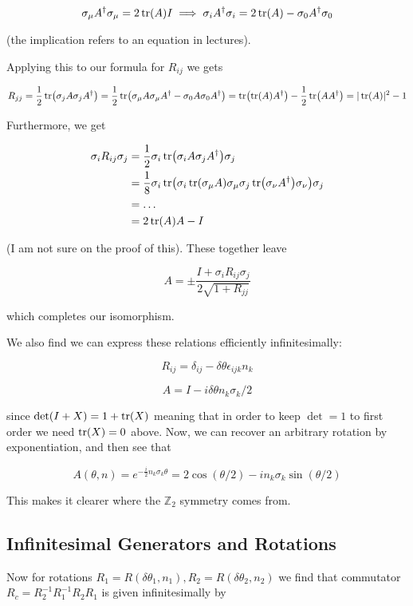 \documentclass{article}
\theoremstyle{definition}
\begin{document}
$$ \sigma_\mu A^\dagger \sigma_\mu = 2 \tr(A) I \implies \sigma_i A^\dagger
\sigma_i = 2 \tr(A) - \sigma_0 A^\dagger \sigma_0 $$

(the implication refers to an equation in lectures).

Applying this to our formula for $R_{ij}$ we gets

$$ R_{jj} = \frac{1}{2} \tr(\sigma_j A \sigma_j A^\dagger) = \frac{1}{2}
\tr(\sigma_\mu A \sigma_\mu A^\dagger - \sigma_0 A \sigma_0 A^\dagger) =
\tr(\tr(A) A^\dagger) - \frac{1}{2} \tr(AA^\dagger) = |\tr(A)|^2 - 1 $$

Furthermore, we get

\begin{align*}
\sigma_i R_{ij} \sigma_j
&= \frac{1}{2} \sigma_i \tr(\sigma_i A \sigma_j A^\dagger) \sigma_j \\
&= \frac{1}{8} \sigma_i \tr(\sigma_i \tr(\sigma_\mu A) \sigma_\mu \sigma_j \tr(\sigma_\nu A^\dagger) \sigma_\nu) \sigma_j \\
&= \dots \\
&= 2\tr(A)A - I
\end{align*}

(I am not sure on the proof of this). These together leave

$$ A = \pm \frac{I + \sigma_i R_{ij} \sigma_j}{2\sqrt{1 + R_{jj}}} $$

which completes our isomorphism.

We also find we can express these relations efficiently infinitesimally:

$$ R_{ij} = \delta_{ij} - \delta \theta \epsilon_{ijk} n_k $$

$$ A = I - i \delta \theta n_k \sigma_k / 2 $$

since $\det(I + X) = 1 + \tr(X)$ meaning that in order to keep $\det = 1$ to
first order we need $\tr(X) = 0$ above. Now, we can recover an arbitrary
rotation by exponentiation, and then see that

$$ A(\theta, n) = e^{-\frac{i}{2} n_k \sigma_k \theta} = 2 \cos(\theta / 2) - i
  n_k \sigma_k \sin(\theta / 2) $$

This makes it clearer where the $\mathbb{Z}_2$ symmetry comes from.

\subsection{Infinitesimal Generators and Rotations}

Now for rotations $R_1 = R(\delta \theta_1, n_1), R_2 = R(\delta \theta_2, n_2)$
we find that commutator $R_c = R_2^{-1}R_1^{-1}R_2R_1$ is given infinitesimally
by
\end{document}
